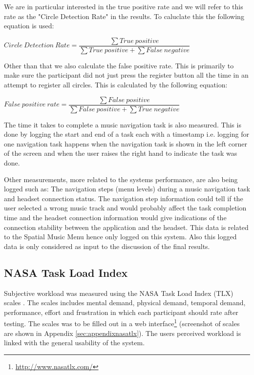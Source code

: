 We are in particular interested in the true positive rate and we will refer to this rate as the "Circle Detection Rate" in the results. To caluclate this the following equation is used:

$Circle \: Detection \: Rate = \dfrac{\sum{}True \: positive}{\sum{}True \: positive + \sum{}False \: negative}$

Other than that we also calculate the false positive rate. This is primarily to make sure the participant did not just press the register button all the time in an attempt to register all circles. This is calculated by the following equation:

$False \: positive \: rate = \dfrac{\sum{}False \: positive}{\sum{}False \: positive + \sum{}True \: negative}$

The time it takes to complete a music navigation task is also measured. This is done by logging the start and end of a task each with a timestamp i.e. logging for one navigation task happens when the navigation task is shown in the left corner of the screen and when the user raises the right hand to indicate the task was done.

Other measurements, more related to the systems performance, are also being logged such as: The navigation steps (menu levels) during a music navigation task and headset connection status. The navigation step information could tell if the user selected a wrong music track and would probably affect the task completion time and the headset connection information would give indications of the connection stability between the application and the headset. This data is related to the Spatial Music Menu hence only logged on this system. Also this logged data is only considered as input to the discussion of the final results.

\subsection{NASA Task Load Index}
\label{sec:evaluationnasatlx}
Subjective workload was measured using the NASA Task Load Index (TLX) scales \cite{hart_workload_1990}. The scales includes mental demand, physical demand, temporal demand, performance, effort and frustration in which each participant should rate after testing. The scales was to be filled out in a web interface\footnote{\url{http://www.nasatlx.com/}} (screenshot of scales are shown in Appendix \ref{sec:appendixnasatlx}). The users perceived workload is linked with the general usability of the system.

